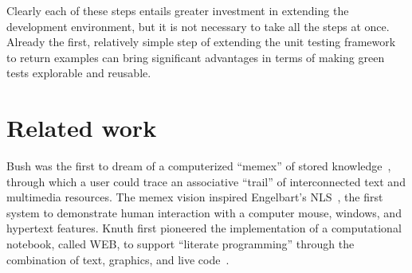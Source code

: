 \documentclass[acmsmall,screen,authorversion,nonacm]{acmart} %
\begin{document}
Clearly each of these steps entails greater investment in extending the development environment, but it is not necessary to take all the steps at once.
Already the first, relatively simple step of extending the unit testing framework to return examples can bring significant advantages in terms of making green tests explorable and reusable.

\section{Related work}\label{sec:related}




Bush was the first to dream of a computerized ``memex'' of stored knowledge~\cite{Bush45a}, through which a user could trace an associative ``trail'' of interconnected text and multimedia resources.
The memex vision inspired Engelbart's NLS~\cite{Enge68a}, the first system to demonstrate human interaction with a computer mouse, windows, and hypertext features.
Knuth first pioneered the implementation of a computational notebook, called WEB, to support ``literate programming'' through the combination of text, graphics, and live code~\cite{Knut97a}.
\end{document}
